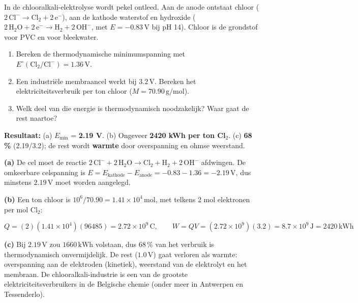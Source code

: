 \begin{oefening}
In de chlooralkali-elektrolyse wordt pekel ontleed. Aan de anode ontstaat chloor (\(\mathrm{2\,Cl^- \rightarrow Cl_2 + 2\,e^-}\)), aan de kathode waterstof en hydroxide (\(\mathrm{2\,H_2O + 2\,e^- \rightarrow H_2 + 2\,OH^-}\), met \(E = -0.83\,\mathrm{V}\) bij pH 14). Chloor is de grondstof voor PVC en voor bleekwater.

\begin{enumerate}
\item[(a)]
  Bereken de thermodynamische minimumspanning met \(E^\circ(\mathrm{Cl_2/Cl^-}) = 1.36\,\mathrm{V}\).
\item[(b)]
  Een industriële membraancel werkt bij \(3.2\,\mathrm{V}\). Bereken het elektriciteitsverbruik per ton chloor (\(M = 70.90\,\mathrm{g/mol}\)).
\item[(c)]
  Welk deel van die energie is thermodynamisch noodzakelijk? Waar gaat de rest naartoe?
\end{enumerate}
\end{oefening}
\begin{oplossing}
\textbf{Resultaat:} (a) \(E_{\min}\) = \textbf{2.19 V}. (b) Ongeveer \textbf{2420 kWh per ton Cl\ensuremath{_{2}}}. (c) \textbf{68 \%} (2.19/3.2); de rest wordt \textbf{warmte} door overspanning en ohmse weerstand.

\textbf{(a)} De cel moet de reactie \(\mathrm{2\,Cl^- + 2\,H_2O \rightarrow Cl_2 + H_2 + 2\,OH^-}\) afdwingen. De omkeerbare celspanning is \(E = E_{\text{kathode}} - E_{\text{anode}} = -0.83 - 1.36 = -2.19\,\mathrm{V}\), dus minstens \(2.19\,\mathrm{V}\) moet worden aangelegd.

\textbf{(b)} Een ton chloor is \(10^6/70.90 = 1.41\times10^{4}\,\mathrm{mol}\), met telkens 2 mol elektronen per mol \(\mathrm{Cl_2}\):

\[
Q = (2)(1.41\times10^{4})(96485) = 2.72\times10^{9}\,\mathrm{C}, \qquad W = QV = (2.72\times10^{9})(3.2) = 8.7\times10^{9}\,\mathrm{J} = 2420\,\mathrm{kWh}
\]

\textbf{(c)} Bij \(2.19\,\mathrm{V}\) zou \(1660\,\mathrm{kWh}\) volstaan, dus \(68\,\%\) van het verbruik is thermodynamisch onvermijdelijk. De rest (\(1.0\,\mathrm{V}\)) gaat verloren als warmte: overspanning aan de elektroden (kinetiek), weerstand van de elektrolyt en het membraan. De chlooralkali-industrie is een van de grootste elektriciteitsverbruikers in de Belgische chemie (onder meer in Antwerpen en Tessenderlo).
\end{oplossing}

